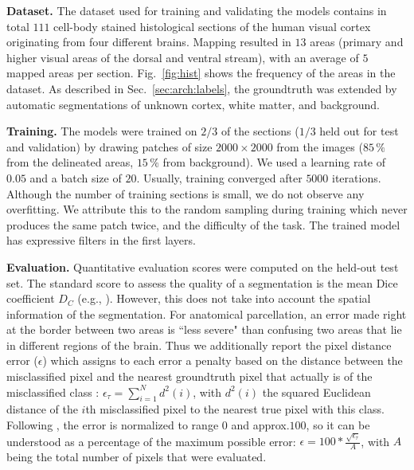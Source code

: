 \documentclass{article}
\begin{document}

\textbf{Dataset.} 
The dataset used for training and validating the models contains in total $111$ cell-body stained histological sections of the human visual cortex originating from four different brains. 
Mapping resulted in $13$ areas (primary and higher visual areas of the dorsal and ventral stream), with an average of $5$ mapped areas per section. 
Fig.~\ref{fig:hist} shows the frequency of the areas in the dataset.
As described in Sec.~\ref{sec:arch:labels}, the groundtruth was extended by automatic segmentations of unknown cortex, white matter, and background. 

\textbf{Training.} 
The models were trained on $2/3$ of the sections ($1/3$ held out for test and validation) by drawing patches of size $2000\times2000$ from the images ($85\,\%$ from the delineated areas, $15\,\%$ from background). 
We used a learning rate of $0.05$ and a batch size of $20$. Usually, training converged after $5000$ iterations.
Although the number of training sections is small, we do not observe any overfitting. We attribute this to the random sampling during training which never produces the same patch twice, and the difficulty of the task. The trained model has expressive filters in the first layers.

\textbf{Evaluation.} 
Quantitative evaluation scores were computed on the held-out test set. 
The standard score to assess the quality of a segmentation is the mean Dice coefficient $D_C$ (e.g., \cite{lee2011, brebisson2015}).
However, this does not take into account the spatial information of the segmentation. 
For anatomical parcellation, an error made right at the border between two areas is ``less severe" than confusing two areas that lie in different regions of the brain. 
Thus we additionally report the pixel distance error ($\epsilon$) which assigns to each error a penalty based on the distance between the misclassified pixel and the nearest groundtruth pixel that actually is of the misclassified class \cite{yasnoff1977}:
$\epsilon_{\tau} = \sum_{i=1}^{N} d^2(i)$, with $d^2(i)$ the squared Euclidean distance of the $i$th misclassified pixel to the nearest true pixel with this class. 
Following \cite{yasnoff1977}, the error is normalized to range $0$ and approx.\;$100$, so it can be understood as a percentage of the maximum possible error: 
$\epsilon = 100*\frac{\sqrt{\epsilon_{\tau}}}{A}$, with $A$ being the total number of pixels that were evaluated.
\end{document}
